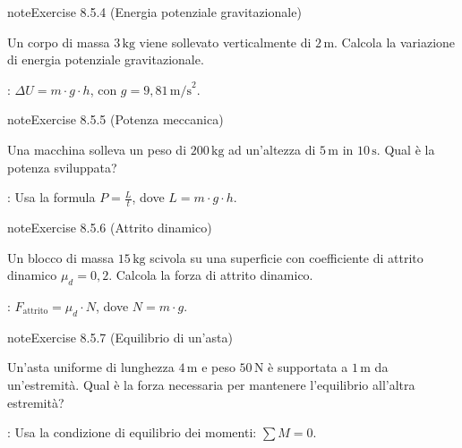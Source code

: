 \documentclass[letterpaper,10pt,italian]{jupyterBook}
\begin{document}
\begin{sphinxadmonition}{note}{Exercise 8.5.4 (Energia potenziale gravitazionale)}



\sphinxAtStartPar
Un corpo di massa \(3 \, \text{kg}\) viene sollevato verticalmente di \(2 \, \text{m}\). Calcola la variazione di energia potenziale gravitazionale.

\sphinxAtStartPar
{}: \( \Delta U = m \cdot g \cdot h \), con \(g = 9,81 \, \text{m/s}^2\).
\end{sphinxadmonition}
 \label{exercise:ch/mechanics/actions-problems-exercise-4}

\begin{sphinxadmonition}{note}{Exercise 8.5.5 (Potenza meccanica)}



\sphinxAtStartPar
Una macchina solleva un peso di \(200 \, \text{kg}\) ad un’altezza di \(5 \, \text{m}\) in \(10 \, \text{s}\). Qual è la potenza sviluppata?

\sphinxAtStartPar
{}: Usa la formula \( P = \frac{L}{t} \), dove \( L = m \cdot g \cdot h \).
\end{sphinxadmonition}
 \label{exercise:ch/mechanics/actions-problems-exercise-5}

\begin{sphinxadmonition}{note}{Exercise 8.5.6 (Attrito dinamico)}



\sphinxAtStartPar
Un blocco di massa \(15 \, \text{kg}\) scivola su una superficie con coefficiente di attrito dinamico \(\mu_d = 0,2\). Calcola la forza di attrito dinamico.

\sphinxAtStartPar
{}: \( F_{\text{attrito}} = \mu_d \cdot N \), dove \(N = m \cdot g\).
\end{sphinxadmonition}
 \label{exercise:ch/mechanics/actions-problems-exercise-6}

\begin{sphinxadmonition}{note}{Exercise 8.5.7 (Equilibrio di un’asta)}



\sphinxAtStartPar
Un’asta uniforme di lunghezza \(4 \, \text{m}\) e peso \(50 \, \text{N}\) è supportata a \(1 \, \text{m}\) da un’estremità. Qual è la forza necessaria per mantenere l’equilibrio all’altra estremità?

\sphinxAtStartPar
{}: Usa la condizione di equilibrio dei momenti: \( \sum M = 0 \).
\end{sphinxadmonition}
 \label{exercise:ch/mechanics/actions-problems-exercise-7}
\end{document}
